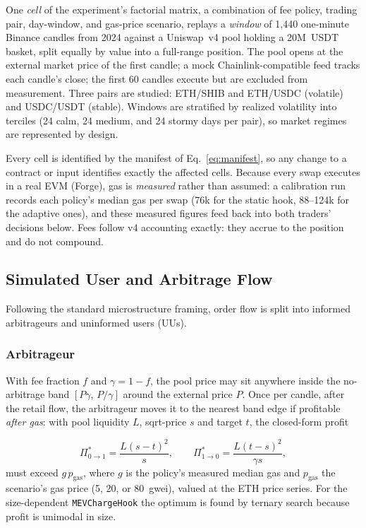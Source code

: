 \documentclass[a4paper,conference]{IEEEtran}
\begin{document}
One \emph{cell} of the experiment's factorial matrix, a
combination of fee policy, trading pair, day-window, and gas-price
scenario, replays a \emph{window} of 1{,}440 one-minute Binance
candles from 2024 against a Uniswap~v4 pool holding a 20M~USDT basket,
split equally by value into a full-range position. The pool opens at the external market price of the first
candle; a mock Chainlink-compatible feed tracks each candle's close; the
first 60 candles execute but are excluded from measurement. Three pairs
are studied: ETH/SHIB and ETH/USDC (volatile) and USDC/USDT (stable). Windows are stratified
by realized volatility into terciles (24 calm, 24 medium, and 24
stormy days per pair), so market regimes are represented by design.

Every cell is identified by the manifest of Eq.~\eqref{eq:manifest}, so any
change to a contract or input identifies exactly the affected cells.
Because every
swap executes in a real EVM (Forge), gas is \emph{measured} rather
than assumed: a calibration run records each policy's median gas per
swap (76k for the static hook, 88--124k for the adaptive ones), and
these measured figures feed back into both traders' decisions below.
Fees follow v4 accounting exactly: they accrue to the position and do
not compound.

\subsection{Simulated User and Arbitrage Flow}

Following the standard microstructure framing, order flow is split into informed arbitrageurs and uninformed users (UUs).

\subsubsection{Arbitrageur}
With fee fraction $f$ and $\gamma=1-f$, the pool price may sit anywhere inside the no-arbitrage band $[P\gamma,\,P/\gamma]$ around the external price $P$. Once per candle, after the retail flow, the arbitrageur moves it to the nearest band edge if profitable \emph{after gas}: with pool liquidity $L$, sqrt-price $s$ and target $t$, the closed-form profit

\begin{equation}
  \Pi^{*}_{0\to1}=\frac{L(s-t)^{2}}{s},\qquad
  \Pi^{*}_{1\to0}=\frac{L(t-s)^{2}}{\gamma s},
  \label{eq:arb-profit}
\end{equation}
must exceed $g\,p_{\mathrm{gas}}$, where $g$ is the policy's measured median gas and $p_{\mathrm{gas}}$ the scenario's gas price (5, 20, or 80~gwei), valued at the ETH price series. For the size-dependent \texttt{MEVChargeHook} the optimum is found by ternary search because profit is unimodal in size.
\end{document}
